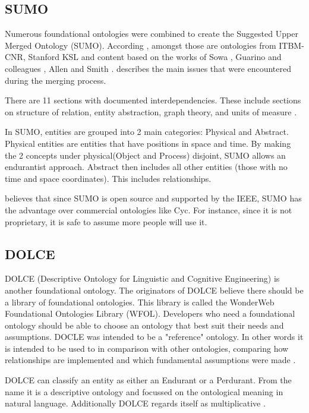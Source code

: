 \documentclass[12pt,a4paper]{article}
\begin{document}
\subsection{SUMO}

Numerous foundational ontologies were combined to create the Suggested Upper Merged Ontology (SUMO)\citep{sumo}. According \cite{sumo}, amongst those are ontologies from ITBM-CNR, Stanford KSL and content based on the works of Sowa \citep{sowa}, Guarino and colleagues \citep{borgo1996pointless}, Allen \citep{J.F.Allen1984} and Smith \citep{Smith1996}. \cite{Niles2001} describes the main issues that were encountered during the merging process.

There are 11 sections with documented interdependencies. These include sections on structure of relation, entity abstraction, graph theory, and units of measure \citep{sumo}.

In SUMO, entities are grouped into 2 main categories: Physical and Abstract. Physical entities are entities that have positions in space and time. By making the 2 concepts under physical(Object and Process) disjoint, SUMO allows an endurantist approach. Abstract then includes all other entities (those with no time and space coordinates). This includes relationships.

\cite{Niles2001} believes that since SUMO is open source and supported by the IEEE, SUMO has the advantage over commercial ontologies like Cyc. For instance, since it is not proprietary, it is safe to assume more people will use it.

\subsection{DOLCE}

DOLCE (Descriptive Ontology for Linguistic and Cognitive Engineering) is another foundational ontology. The originators of DOLCE believe there should be a library of foundational ontologies. This library is called the WonderWeb Foundational Ontologies Library (WFOL). Developers who need a foundational ontology should be able to choose an ontology that best suit their needs and assumptions. DOCLE was intended to be a "reference" ontology. In other words it is intended to be used to in comparison with other ontologies, comparing how relationships are implemented and which fundamental assumptions were made \citep{Masolo2003}.  

DOLCE can classify an entity as either an Endurant or a Perdurant. From the name it is a descriptive ontology and focussed on the ontological meaning in natural language. Additionally DOLCE regards itself as multiplicative \citep{Masolo2003}.
\end{document}
